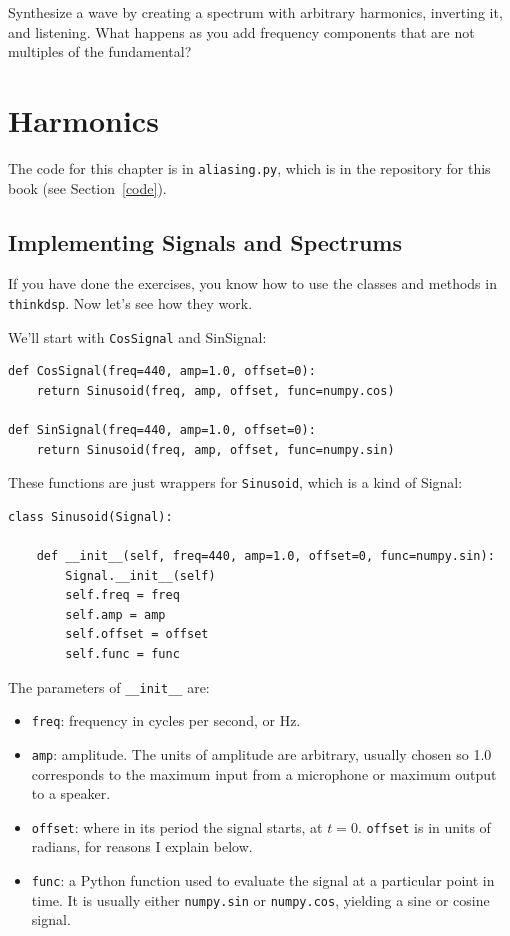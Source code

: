 \documentclass[12pt]{book}
\begin{document}
\begin{exercise}
Synthesize a wave by creating a spectrum with arbitrary harmonics,
inverting it, and listening.  What happens as you add frequency
components that are not multiples of the fundamental?
\end{exercise}



\chapter{Harmonics}
\label{harmonics}

The code for this chapter is in {\tt aliasing.py}, which is in the
repository for this book (see Section~\ref{code}).


\section{Implementing Signals and Spectrums}

If you have done the exercises, you know how to use the classes and
methods in {\tt thinkdsp}.  Now let's see how they work.

We'll start with {\tt CosSignal} and {SinSignal}:

\begin{verbatim}
def CosSignal(freq=440, amp=1.0, offset=0):
    return Sinusoid(freq, amp, offset, func=numpy.cos)

def SinSignal(freq=440, amp=1.0, offset=0):
    return Sinusoid(freq, amp, offset, func=numpy.sin)
\end{verbatim}

These functions are just wrappers for {\tt Sinusoid}, which
is a kind of Signal:

\begin{verbatim}
class Sinusoid(Signal):
    
    def __init__(self, freq=440, amp=1.0, offset=0, func=numpy.sin):
        Signal.__init__(self)
        self.freq = freq
        self.amp = amp
        self.offset = offset
        self.func = func
\end{verbatim}

The parameters of \verb"__init__" are:

\begin{itemize}

\item {\tt freq}: frequency in cycles per second, or Hz.

\item {\tt amp}: amplitude.  The units of amplitude are arbitrary,
usually chosen so 1.0 corresponds to the maximum input from a
microphone or maximum output to a speaker.

\item {\tt offset}: where in its period the signal starts, at $t=0$.
{\tt offset} is in units of radians, for reasons I explain below.

\item {\tt func}: a Python function used
to evaluate the signal at a particular point in time.  It is
usually either {\tt numpy.sin} or {\tt numpy.cos}, yielding a sine or
cosine signal.

\end{itemize}
\end{document}
